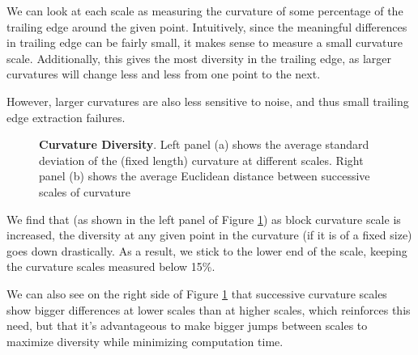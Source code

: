 We can look at each scale as measuring the curvature of some percentage of the trailing edge around the given point.
Intuitively, since the meaningful differences in trailing edge can be fairly small, it makes sense to measure a small curvature scale.
Additionally, this gives the most diversity in the trailing edge, as larger curvatures will change less and less from one point to the next.

However, larger curvatures are also less sensitive to noise, and thus small trailing edge extraction failures.


\begin{figure}[t]%
	\centering
	\caption[]{\textbf{Curvature Diversity}. Left panel (a) shows the average standard deviation of the (fixed length) curvature at different scales. Right panel (b) shows the average Euclidean distance between successive scales of curvature}
    	\label{fig:curvature_diversity}
\end{figure}


We find that (as shown in the left panel of Figure \ref{fig:curvature_diversity}) as block curvature scale is increased, the diversity at any given point in the curvature (if it is of a fixed size) goes down drastically. 
As a result, we stick to the lower end of the scale, keeping the curvature scales measured below 15\%.

We can also see on the right side of Figure \ref{fig:curvature_diversity} that successive curvature scales show bigger differences at lower scales than at higher scales, which reinforces this need, but that it's advantageous to make bigger jumps between scales to maximize diversity while minimizing computation time.


